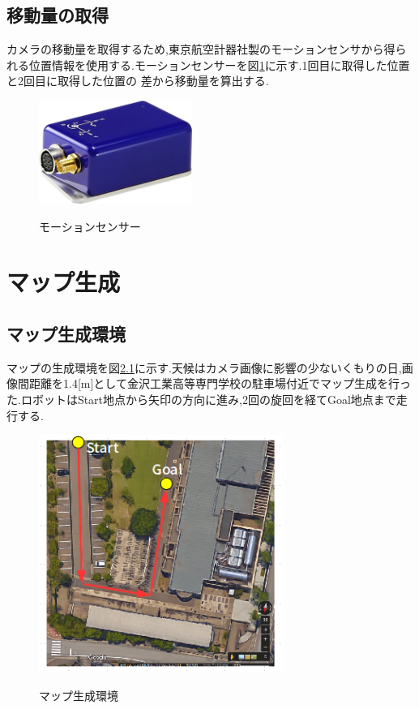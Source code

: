 \documentclass[12pt,oneside]{sotsuken_paper}
\begin{document}
\section{移動量の取得}
カメラの移動量を取得するため,東京航空計器社製のモーションセンサから得られる位置情報を使用する.モーションセンサーを図\ref{fig:motion}に示す.1回目に取得した位置と2回目に取得した位置の
差から移動量を算出する.

\begin{figure}[htp]
 \begin{center}
  \includegraphics[width=50mm]{img/soft/motion.jpg}
 　\caption{モーションセンサー}
  \label{fig:motion}%
 \end{center}
\end{figure}



\chapter{マップ生成}

\section{マップ生成環境}
マップの生成環境を図\ref{fig:map}に示す.天候はカメラ画像に影響の少ないくもりの日,画像間距離を1.4[m]として金沢工業高等専門学校の駐車場付近でマップ生成を行った.ロボットはStart地点から矢印の方向に進み,2回の旋回を経てGoal地点まで走行する.

\begin{figure}[htp]
 \begin{center}
  \includegraphics[width=80mm]{img/soft/1.png}
 　\caption{マップ生成環境}
  \label{fig:map}%
 \end{center}
\end{figure}
\end{document}
